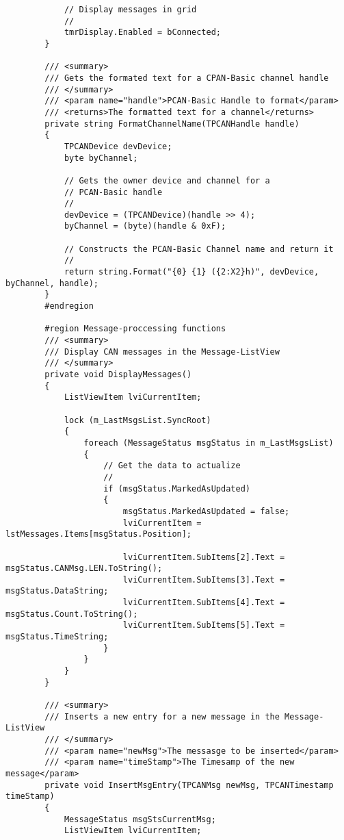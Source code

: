 \begin{lstlisting}
            // Display messages in grid
            //
            tmrDisplay.Enabled = bConnected;
        }

        /// <summary>
        /// Gets the formated text for a CPAN-Basic channel handle
        /// </summary>
        /// <param name="handle">PCAN-Basic Handle to format</param>
        /// <returns>The formatted text for a channel</returns>
        private string FormatChannelName(TPCANHandle handle)
        {
            TPCANDevice devDevice;
            byte byChannel;

            // Gets the owner device and channel for a
            // PCAN-Basic handle
            //
            devDevice = (TPCANDevice)(handle >> 4);
            byChannel = (byte)(handle & 0xF);

            // Constructs the PCAN-Basic Channel name and return it
            //
            return string.Format("{0} {1} ({2:X2}h)", devDevice, byChannel, handle);
        }
        #endregion

        #region Message-proccessing functions
        /// <summary>
        /// Display CAN messages in the Message-ListView
        /// </summary>
        private void DisplayMessages()
        {
            ListViewItem lviCurrentItem;

            lock (m_LastMsgsList.SyncRoot)
            {
                foreach (MessageStatus msgStatus in m_LastMsgsList)
                {
                    // Get the data to actualize
                    //
                    if (msgStatus.MarkedAsUpdated)
                    {
                        msgStatus.MarkedAsUpdated = false;
                        lviCurrentItem = lstMessages.Items[msgStatus.Position];

                        lviCurrentItem.SubItems[2].Text = msgStatus.CANMsg.LEN.ToString();
                        lviCurrentItem.SubItems[3].Text = msgStatus.DataString;
                        lviCurrentItem.SubItems[4].Text = msgStatus.Count.ToString();
                        lviCurrentItem.SubItems[5].Text = msgStatus.TimeString;
                    }
                }
            }
        }

        /// <summary>
        /// Inserts a new entry for a new message in the Message-ListView
        /// </summary>
        /// <param name="newMsg">The messasge to be inserted</param>
        /// <param name="timeStamp">The Timesamp of the new message</param>
        private void InsertMsgEntry(TPCANMsg newMsg, TPCANTimestamp timeStamp)
        {
            MessageStatus msgStsCurrentMsg;
            ListViewItem lviCurrentItem;


\end{lstlisting}
